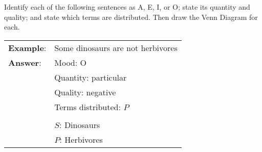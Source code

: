 
\practiceproblems

\problempart Identify each of the following sentences as A, E, I, or O; state its quantity and quality; and state which terms are distributed. Then draw the Venn Diagram for each.

\begin{longtabu}{p{.1\linewidth}p{.9\linewidth}}
\textbf{Example}: & Some dinosaurs are not herbivores \\
\textbf{Answer}: & Mood: O\\
&Quantity: particular \\
&Quality: negative \\
&Terms distributed: $P$ \\
&
\noindent {}\\
& $S$: Dinosaurs \\
& $P$: Herbivores
\end{longtabu}

